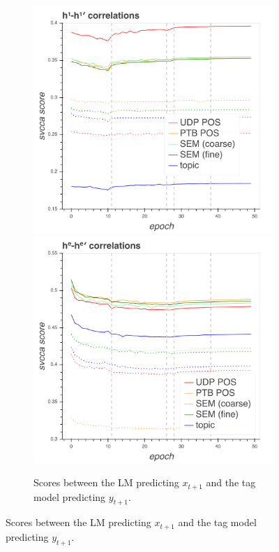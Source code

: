 \begin{figure}
\begin{subfigure}{.48\textwidth}
\includegraphics[width=\textwidth]{svcca/lstm1_cca.png}
\includegraphics[width=\textwidth]{svcca/encoder-cca.png}
\caption{Scores between the LM predicting $x_{t+1}$ and the tag model predicting $y_{t+1}$.}
\label{fig:svcca_encoder_rnn_1}
\end{subfigure}
\hfill

\end{figure}
